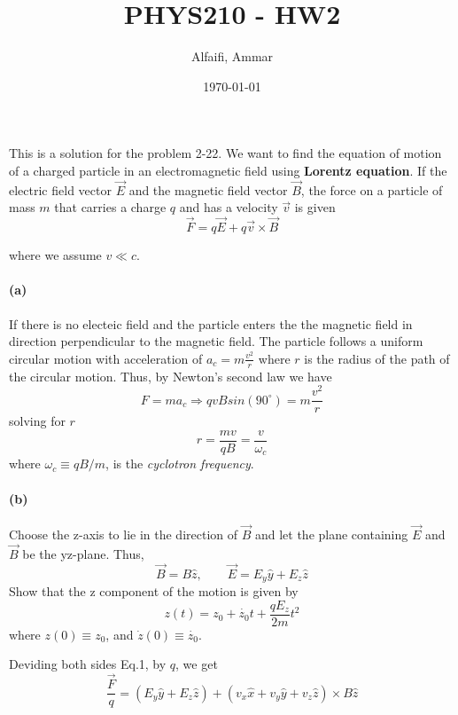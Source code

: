 \documentclass{article}
\title{PHYS210 - HW2}
\author{Alfaifi, Ammar}
\date{\today}
\begin{document}
    \maketitle

    \paragraph{}
    This is a solution for the problem 2-22.
    We want to find the equation of motion of a charged particle in an  
    electromagnetic field using \textbf{Lorentz equation}.
    If the electric field vector $\vec{E}$ and the magnetic field vector $\vec{B}$,
    the force on a particle of mass $m$ that carries a charge $q$ and has a velocity
    $\vec{v}$ is given
    \begin{equation} 
        \label{eq:lorentz}   
        \vec{F} = q \vec{E} + q \vec{v} \times \vec{B}
    \end{equation}
    
    where we assume $v \ll c$.
    \paragraph{(a)} If there is no electeic field and the particle enters the
    the magnetic field in direction perpendicular to the magnetic field. The 
    particle follows a uniform circular motion with acceleration of $a_c=m \frac{v^2}{r}$
    where $r$ is the radius of the path of the circular motion.
    Thus, by Newton's second law we have
    $$
        F = ma_c \Rightarrow qvB sin(90^\circ) = m  \frac{v^2}{r}
    $$
    solving for $r$
    $$ r = \frac{mv}{qB} = \frac{v}{\omega_c} $$
    where $\omega_c \equiv qB/m$, is the \textit{cyclotron frequency}.

    \paragraph{(b)} Choose the z-axis to lie in the direction of $\vec{B}$ and let
    the plane containing $\vec{E}$ and $\vec{B}$ be the yz-plane. Thus,
    $$
        \vec{B} = B \hat{z}, \qquad \vec{E} = E_y \hat{y} + E_z \hat{z}
    $$
    Show that the z component of the motion is given by 
    $$
        z(t) = z_0 + \dot{z_0}t + \frac{qE_z}{2m} t^2
    $$
    where $z(0) \equiv z_0$, and $ \dot{z}(0) \equiv \dot{z_0}$.

    Deviding both sides Eq.1, by $q$, we get
    \begin{equation}
        \frac{\vec{F}}{q} = (E_y \hat{y} + E_z \hat{z}) + (v_x \hat{x}+v_y \hat{y}+v_z \hat{z}) \times B \hat{z}
    \end{equation}
\end{document}
